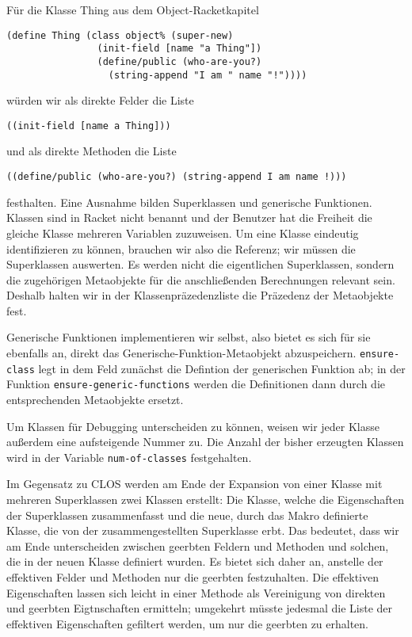 Für die Klasse Thing aus dem Object-Racketkapitel

\begin{lstlisting}
(define Thing (class object% (super-new)
                (init-field [name "a Thing"])
                (define/public (who-are-you?) 
                  (string-append "I am " name "!"))))
\end{lstlisting}

würden wir als direkte Felder die Liste 

\texttt{{\textquotesingle}((init-field [name {\qq}a Thing\qq]))} 

und als direkte Methoden die Liste 

\texttt{{\textquotesingle}((define/public (who-are-you?) (string-append {\qq}I am {\qq} name \qq!\qq)))} 

festhalten. Eine Ausnahme bilden Superklassen und generische Funktionen. Klassen sind in Racket nicht benannt und der Benutzer hat die Freiheit die gleiche Klasse mehreren Variablen zuzuweisen. Um eine Klasse eindeutig identifizieren zu können, brauchen wir also die Referenz; wir müssen die Superklassen auswerten. Es werden nicht die eigentlichen Superklassen, sondern die zugehörigen Metaobjekte für die anschließenden Berechnungen relevant sein. Deshalb halten wir in der Klassenpräzedenzliste die Präzedenz der Metaobjekte fest. 

Generische Funktionen implementieren wir selbst, also bietet es sich für sie ebenfalls an, direkt das Generische-Funktion-Metaobjekt abzuspeichern. \texttt{ensure-class} legt in dem Feld zunächst die Defintion der generischen Funktion ab; in der Funktion \texttt{ensure-generic-functions} werden die Definitionen dann durch die entsprechenden Metaobjekte ersetzt.

Um Klassen für Debugging unterscheiden zu können, weisen wir jeder Klasse außerdem eine aufsteigende Nummer zu. Die Anzahl der bisher erzeugten Klassen wird in der Variable \texttt{num-of-classes} festgehalten.

Im Gegensatz zu CLOS werden am Ende der Expansion von einer Klasse mit mehreren Superklassen zwei Klassen erstellt: Die Klasse, welche die Eigenschaften der Superklassen zusammenfasst und die neue, durch das Makro definierte Klasse, die von der zusammengestellten Superklasse erbt. Das bedeutet, dass wir am Ende unterscheiden zwischen geerbten Feldern und Methoden und solchen, die in der neuen Klasse definiert wurden. Es bietet sich daher an, anstelle der effektiven Felder und Methoden nur die geerbten festzuhalten. Die effektiven Eigenschaften lassen sich leicht in einer Methode als Vereinigung von direkten und geerbten Eigtnschaften ermitteln; umgekehrt müsste jedesmal die Liste der effektiven Eigenschaften gefiltert werden, um nur die geerbten zu erhalten. 

